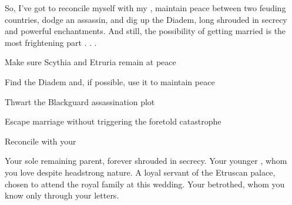 \documentclass[char]{Kos}
\begin{document}
So, I've got to reconcile myself with my \cPoet{\sibling}, maintain peace between two feuding countries, dodge an assassin, and dig up the Diadem, long shrouded in secrecy and powerful enchantments. And still, the possibility of getting married is the most frightening part . . .

\begin{itemz}[Goals]
 \item Make sure Scythia and Etruria remain at peace
 \item Find the Diadem and, if possible, use it to maintain peace
 \item Thwart the Blackguard assassination plot 
 \item Escape marriage without triggering the foretold catastrophe
 \item Reconcile with your \cPoet{\sibling}
\end{itemz}

\begin{contacts}
\contact{\cEtruriaKing{}} Your sole remaining parent, forever shrouded in secrecy.
\contact{\cPoet{}} Your younger \cPoet{\sibling}, whom you love despite \cPoet{\their} headstrong nature.
\contact{\cAssassin{}} A loyal servant of the Etruscan palace, chosen to attend the royal family at this wedding.
\contact{\cBride{}} Your betrothed, whom you know only through your letters.
\end{contacts} 
\end{document}
